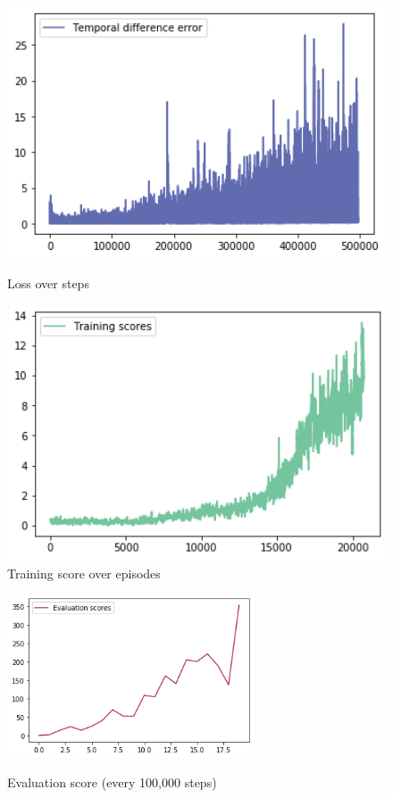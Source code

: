\documentclass[12pt]{article}
\begin{document}
\begin{figure}[H]
	\centering
	\begin{minipage}{0.49\textwidth}
		\centering
		\includegraphics[width=1\textwidth]{images/4_loss.png} %
		\caption{Loss over steps}
	\end{minipage}\hfill
	\begin{minipage}{0.49\textwidth}
		\centering
		\includegraphics[width=1\textwidth]{images/4_score_train.png} %
		\caption{Training score over episodes}
	\end{minipage}
	\label{fig:breakout_loss_trainscore}
\end{figure}

\begin{figure}[H]
	\centering
	\includegraphics[width=0.65\textwidth]{images/4_score_eval.png} 
	\label{fig:breakout_evalscore}
	\caption{Evaluation score (every 100,000 steps)}
\end{figure}
\end{document}
